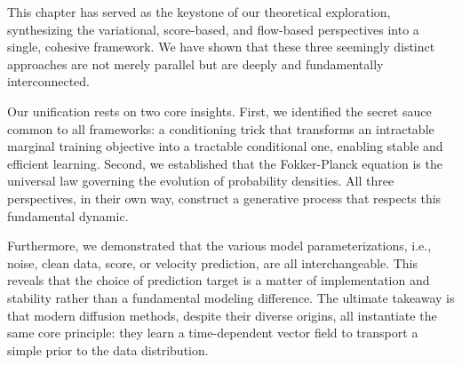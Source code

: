 




This chapter has served as the keystone of our theoretical exploration, synthesizing the variational, score-based, and flow-based perspectives into a single, cohesive framework. We have shown that these three seemingly distinct approaches are not merely parallel but are deeply and fundamentally interconnected.

Our unification rests on two core insights. First, we identified the secret sauce common to all frameworks: a conditioning trick that transforms an intractable marginal training objective into a tractable conditional one, enabling stable and efficient learning. Second, we established that the Fokker-Planck equation is the universal law governing the evolution of probability densities. All three perspectives, in their own way, construct a generative process that respects this fundamental dynamic.


Furthermore, we demonstrated that the various model parameterizations, i.e., noise, clean data, score, or velocity prediction, are all interchangeable. This reveals that the choice of prediction target is a matter of implementation and stability rather than a fundamental modeling difference. The ultimate takeaway is that modern diffusion methods, despite their diverse origins, all instantiate the same core principle: they learn a time-dependent vector field to transport a simple prior to the data distribution.



